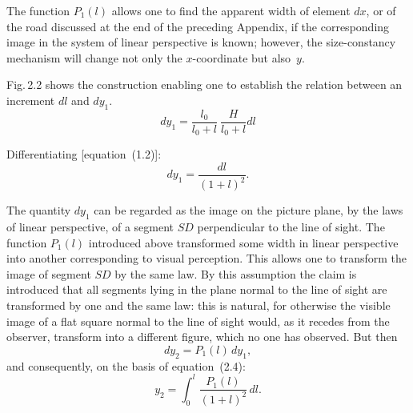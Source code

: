 The function $P_1(l)$ allows one to find the apparent width of element $dx$, or of the road
discussed at the end of the preceding Appendix, if the corresponding image in the system of
linear perspective is known; however, the size-constancy mechanism will change not only
the $x$-coordinate but also~$y$.

Fig.\,2.2 shows the construction enabling one to establish the relation between an increment $dl$ and $dy_1$. 
\begin{equation*}
    dy_1 = \frac{l_0}{l_0+l} \ \frac{H}{l_0+l}dl
\end{equation*}

Differentiating [equation~(1.2)]:
\begin{equation}
  dy_1 = \frac{dl}{(1+l)^2}.
  \tag{2.4}
\end{equation}


The quantity $dy_1$ can be regarded as the image on the picture plane, by the laws of linear
perspective, of a segment $SD$ perpendicular to the line of sight.  The function $P_1(l)$
introduced above transformed some width in linear perspective into another corresponding
to visual perception.  This allows one to transform the image of segment $SD$ by the same
law.  By this assumption the claim is introduced that all segments lying in the plane normal
to the line of sight are transformed by one and the same law: this is natural, for otherwise
the visible image of a flat square normal to the line of sight would, as it recedes from the
observer, transform into a different figure, which no one has observed.  But then
\begin{equation}
  dy_2 = P_1(l)\,dy_1,
  \tag{2.5}
\end{equation}
and consequently, on the basis of equation~(2.4):
\begin{equation}
  y_2 = \int_0^l \frac{P_1(l)}{(1+l)^2}\,dl.
  \tag{2.6}
\end{equation}

